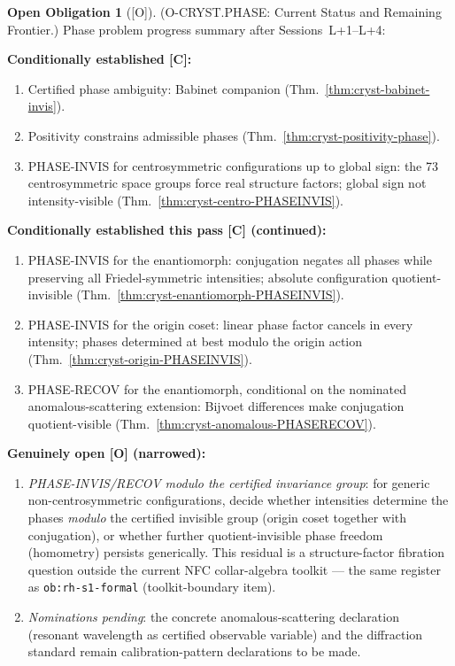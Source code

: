 \documentclass[12pt,oneside]{amsbook}
\theoremstyle{plain}
\theoremstyle{definition}
\newtheorem{obligation}[theorem]{Open Obligation}
\theoremstyle{remark}
\newcommand{\status}[1]{\textup{[#1]}}
\begin{document}
\begin{obligation}[\status{O}]\label{ob:cryst-PHASE-progress}
\textup{(O-CRYST.PHASE: Current Status and Remaining Frontier.)}
Phase problem progress summary after Sessions~L+1--L+4:

\medskip
\textbf{Conditionally established [C]:}
\begin{enumerate}[label=\textup{(\arabic*)}]
  \item Certified phase ambiguity: Babinet companion
    (Thm.~\ref{thm:cryst-babinet-invis}).
  \item Positivity constrains admissible phases
    (Thm.~\ref{thm:cryst-positivity-phase}).
  \item PHASE-INVIS for centrosymmetric configurations up to
    global sign: the 73 centrosymmetric space groups force
    real structure factors; global sign not intensity-visible
    (Thm.~\ref{thm:cryst-centro-PHASEINVIS}).
\end{enumerate}

\textbf{Conditionally established this pass [C] (continued):}
\begin{enumerate}[label=\textup{(\arabic*)}, start=4]
  \item PHASE-INVIS for the enantiomorph: conjugation negates all
    phases while preserving all Friedel-symmetric intensities;
    absolute configuration quotient-invisible
    (Thm.~\ref{thm:cryst-enantiomorph-PHASEINVIS}).
  \item PHASE-INVIS for the origin coset: linear phase factor
    cancels in every intensity; phases determined at best modulo
    the origin action (Thm.~\ref{thm:cryst-origin-PHASEINVIS}).
  \item PHASE-RECOV for the enantiomorph, conditional on the
    nominated anomalous-scattering extension: Bijvoet differences
    make conjugation quotient-visible
    (Thm.~\ref{thm:cryst-anomalous-PHASERECOV}).
\end{enumerate}

\textbf{Genuinely open [O] (narrowed):}
\begin{enumerate}[label=\textup{(\arabic*)}]
  \item \emph{PHASE-INVIS/RECOV modulo the certified invariance
    group}: for generic non-centrosymmetric configurations, decide
    whether intensities determine the phases \emph{modulo} the
    certified invisible group (origin coset together with
    conjugation), or whether further quotient-invisible phase
    freedom (homometry) persists generically.  This residual is a
    structure-factor fibration question outside the current NFC
    collar-algebra toolkit --- the same register as
    \texttt{ob:rh-s1-formal} (toolkit-boundary item).
  \item \emph{Nominations pending}: the concrete
    anomalous-scattering declaration (resonant wavelength as
    certified observable variable) and the diffraction standard
    remain calibration-pattern declarations to be made.
\end{enumerate}
\end{obligation}
\end{document}
